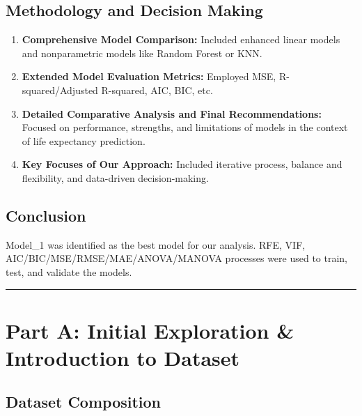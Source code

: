 \documentclass[
]{article}
\providecommand{\tightlist}{%
  \setlength{\itemsep}{0pt}\setlength{\parskip}{0pt}}
\begin{document}
\hypertarget{methodology-and-decision-making}{%
\subsection{Methodology and Decision
Making}\label{methodology-and-decision-making}}

\begin{enumerate}
\def\labelenumi{\arabic{enumi}.}
\tightlist
\item
  \textbf{Comprehensive Model Comparison:} Included enhanced linear
  models and nonparametric models like Random Forest or KNN.
\item
  \textbf{Extended Model Evaluation Metrics:} Employed MSE,
  R-squared/Adjusted R-squared, AIC, BIC, etc.
\item
  \textbf{Detailed Comparative Analysis and Final Recommendations:}
  Focused on performance, strengths, and limitations of models in the
  context of life expectancy prediction.
\item
  \textbf{Key Focuses of Our Approach:} Included iterative process,
  balance and flexibility, and data-driven decision-making.
\end{enumerate}

\hypertarget{conclusion}{%
\subsection{Conclusion}\label{conclusion}}

Model\_1 was identified as the best model for our analysis. RFE, VIF,
AIC/BIC/MSE/RMSE/MAE/ANOVA/MANOVA processes were used to train, test,
and validate the models.

\begin{center}\rule{0.5\linewidth}{0.5pt}\end{center}

\hypertarget{part-a-initial-exploration-introduction-to-dataset}{%
\section{Part A: Initial Exploration \& Introduction to
Dataset}\label{part-a-initial-exploration-introduction-to-dataset}}

\hypertarget{dataset-composition}{%
\subsection{Dataset Composition}\label{dataset-composition}}
\end{document}
